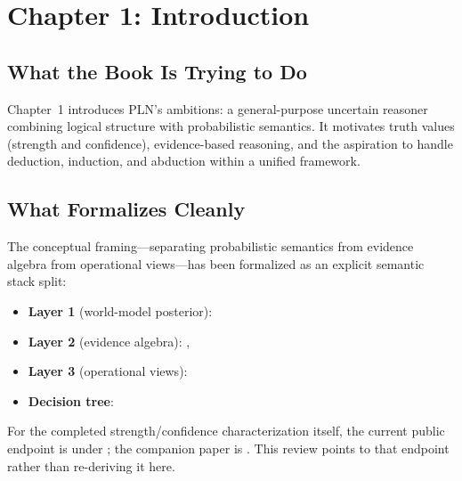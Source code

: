 \documentclass[11pt,openany]{report}
\begin{document}

\chapter{Chapter 1: Introduction}
\label{ch:review-ch1}

\section{What the Book Is Trying to Do}

Chapter~1 introduces PLN's ambitions: a general-purpose uncertain reasoner
combining logical structure with probabilistic semantics.  It motivates
truth values (strength and confidence), evidence-based reasoning, and the
aspiration to handle deduction, induction, and abduction within a unified
framework.

\section{What Formalizes Cleanly}

The conceptual framing---separating probabilistic semantics from evidence
algebra from operational views---has been formalized as an explicit semantic
stack split:

\begin{itemize}
\item \textbf{Layer 1} (world-model posterior): 
\item \textbf{Layer 2} (evidence algebra): ,
\item \textbf{Layer 3} (operational views): 
\item \textbf{Decision tree}: 
\end{itemize}

For the completed strength/confidence characterization itself, the current
public endpoint is  under
; the companion paper is
.  This review points to
that endpoint rather than re-deriving it here.
\end{document}
